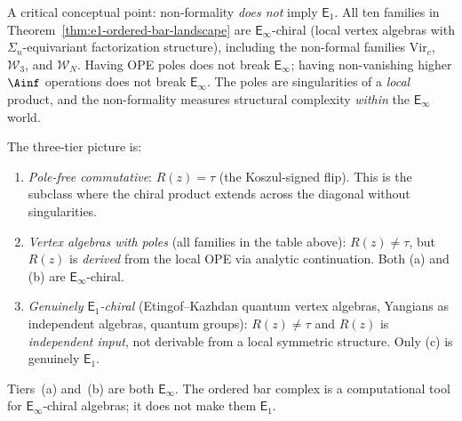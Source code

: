 \begin{remark}%
\label{rem:formality-e1-e-infty}%
%
%
%
A critical conceptual point: non-formality \emph{does not}
imply $\mathsf{E}_1$. All ten families in
Theorem~\textup{\ref{thm:e1-ordered-bar-landscape}} are
$\mathsf{E}_\infty$-chiral \textup{(}local vertex algebras with
$\Sigma_n$-equivariant factorization structure\textup{)}, including
the non-formal families $\mathrm{Vir}_c$, $\mathcal{W}_3$, and
$\mathcal{W}_N$. Having OPE poles does not break
$\mathsf{E}_\infty$; having non-vanishing higher $\Ainf$
operations does not break $\mathsf{E}_\infty$. The poles
are singularities of a \emph{local} product, and the
non-formality measures structural complexity \emph{within}
the $\mathsf{E}_\infty$ world.

The three-tier picture is:
\begin{enumerate}[label=\textup{(\alph*)}]
\item \emph{Pole-free commutative}:
 $R(z) = \tau$ (the Koszul-signed flip).
 This is the subclass where the chiral product extends
 across the diagonal without singularities.

\item \emph{Vertex algebras with poles}
 \textup{(}all families in the table above\textup{)}:
 $R(z) \ne \tau$, but $R(z)$ is \emph{derived} from the
 local OPE via analytic continuation.
 Both (a) and (b) are $\mathsf{E}_\infty$-chiral.

\item \emph{Genuinely $\mathsf{E}_1$-chiral}
 \textup{(}Etingof--Kazhdan quantum vertex algebras,
 Yangians as independent algebras, quantum groups\textup{)}:
 $R(z) \ne \tau$ and $R(z)$ is \emph{independent input},
 not derivable from a local symmetric structure.
 Only (c) is genuinely $\mathsf{E}_1$.
\end{enumerate}
Tiers~(a) and~(b) are both $\mathsf{E}_\infty$.
The ordered bar complex is a computational tool for
$\mathsf{E}_\infty$-chiral algebras; it does not make them
$\mathsf{E}_1$.
\end{remark}

